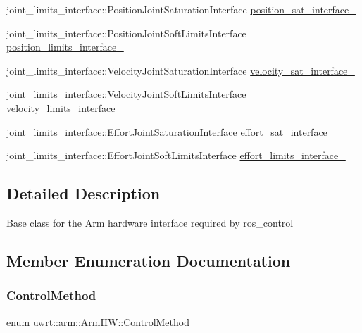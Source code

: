 \begin{DoxyCompactItemize}
joint\+\_\+limits\+\_\+interface\+::\+Position\+Joint\+Saturation\+Interface \hyperlink{classuwrt_1_1arm_1_1_arm_h_w_ad940f7d5b2561be5ff6c3350480e20b5}{position\+\_\+sat\+\_\+interface\+\_\+}
\item 
joint\+\_\+limits\+\_\+interface\+::\+Position\+Joint\+Soft\+Limits\+Interface \hyperlink{classuwrt_1_1arm_1_1_arm_h_w_a84a73ead7105311112f7fe8ae7eda096}{position\+\_\+limits\+\_\+interface\+\_\+}
\item 
joint\+\_\+limits\+\_\+interface\+::\+Velocity\+Joint\+Saturation\+Interface \hyperlink{classuwrt_1_1arm_1_1_arm_h_w_a461fd5b0255bf2d1eecfb384ff7f1987}{velocity\+\_\+sat\+\_\+interface\+\_\+}
\item 
joint\+\_\+limits\+\_\+interface\+::\+Velocity\+Joint\+Soft\+Limits\+Interface \hyperlink{classuwrt_1_1arm_1_1_arm_h_w_a8e2811fbe4adfcbcce9efbee3756ea8f}{velocity\+\_\+limits\+\_\+interface\+\_\+}
\item 
joint\+\_\+limits\+\_\+interface\+::\+Effort\+Joint\+Saturation\+Interface \hyperlink{classuwrt_1_1arm_1_1_arm_h_w_a6272ed655471405069584b1afd4de5a7}{effort\+\_\+sat\+\_\+interface\+\_\+}
\item 
joint\+\_\+limits\+\_\+interface\+::\+Effort\+Joint\+Soft\+Limits\+Interface \hyperlink{classuwrt_1_1arm_1_1_arm_h_w_ac1add3b1c8d7423339d24de09a706485}{effort\+\_\+limits\+\_\+interface\+\_\+}
\end{DoxyCompactItemize}


\subsection{Detailed Description}
Base class for the Arm hardware interface required by ros\+\_\+control 

\subsection{Member Enumeration Documentation}
\mbox{\label{classuwrt_1_1arm_1_1_arm_h_w_aef42f10e04f7f426b3d06f91d0897b6b}} 
\subsubsection{\texorpdfstring{Control\+Method}{ControlMethod}}
{\footnotesize\ttfamily enum \hyperlink{classuwrt_1_1arm_1_1_arm_h_w_aef42f10e04f7f426b3d06f91d0897b6b}{uwrt\+::arm\+::\+Arm\+H\+W\+::\+Control\+Method}\hspace{0.3cm}{\ttfamily [protected]}}



